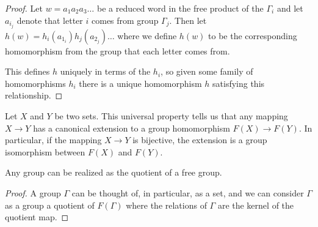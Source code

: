 \begin{proof}
	
	Let $w = a_1a_2a_3\dots$ be a reduced word in the free product of the $\Gamma_i$ and let $a_{i_j}$ denote that letter $i$ comes from group $\Gamma_j$.  Then let $h(w) = h_i(a_{1_i})h_j(a_{2_j})\dots$ where we define $h(w)$ to be the corresponding homomorphism from the group that each letter comes from.
	
	This defines $h$ uniquely in terms of the $h_i$, so given some family of homomorphisms $h_i$ there is a unique homomorphism $h$ satisfying this relationship.
\end{proof}


Let $X$ and $Y$ be two sets.  This universal property tells us that any mapping $X\rightarrow Y$ has a canonical extension to a group homomorphism $F(X)\rightarrow F(Y)$.  In particular, if the mapping $X\rightarrow Y$ is bijective, the extension is a group isomorphism between $F(X)$ and $F(Y)$. 

\begin{corollary}
	Any group can be realized as the quotient of a free group.
\end{corollary}

\begin{proof}
	A group $\Gamma$ can be thought of, in particular, as a set, and we can consider $\Gamma$ as a group a quotient of $F(\Gamma)$ where the relations of $\Gamma$ are the kernel of the quotient map.
	
\end{proof}

	
